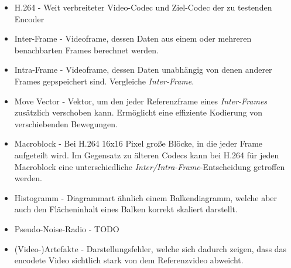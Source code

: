 \begin{itemize}
    \item H.264 - Weit verbreiteter Video-Codec und Ziel-Codec der zu testenden Encoder
    \item Inter-Frame - Videoframe, dessen Daten aus einem oder mehreren benachbarten Frames berechnet werden.
    \item Intra-Frame - Videoframe, dessen Daten unabhängig von denen anderer Frames gepspeichert sind. Vergleiche \emph{Inter-Frame}.
    \item Move Vector - Vektor, um den jeder Referenzframe eines \emph{Inter-Frames} zusätzlich verschoben kann. Ermöglicht eine effiziente Kodierung von verschiebenden Bewegungen.
    \item Macroblock - Bei H.264 16x16 Pixel große Blöcke, in die jeder Frame aufgeteilt wird. Im Gegensatz zu älteren Codecs kann bei H.264 für jeden Macroblock eine unterschiedliche \emph{Inter/Intra-Frame}-Entscheidung getroffen werden. 
    \item Histogramm - Diagrammart ähnlich einem Balkendiagramm, welche aber auch den Flächeninhalt eines Balken korrekt skaliert darstellt.
    \item Pseudo-Noise-Radio - TODO %
    \item (Video-)Artefakte - Darstellungsfehler, welche sich dadurch zeigen, dass das encodete Video sichtlich stark von dem Referenzvideo abweicht.
\end{itemize}
